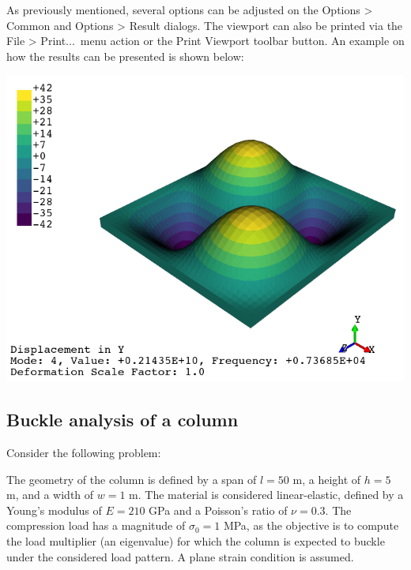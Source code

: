 \documentclass[
    11pt,        %
    a4paper,     %
    final,       %
    fleqn,       %
    notitlepage, %
    onecolumn,   %
    oneside,     %
]{article}
\begin{document}
As previously mentioned, several options can be adjusted on the Options > Common and Options > Result dialogs. The viewport can also be printed via the File > Print...\ menu action or the Print Viewport toolbar button. An example on how the results can be presented is shown below:
\begin{center}
    \includegraphics[scale=0.5]{fig/ui-3-11.png}
\end{center}

\subsection{Buckle analysis of a column}

Consider the following problem:
\begin{center}
\end{center}
The geometry of the column is defined by a span of $l = 50$ m, a height of $h = 5$ m, and a width of $w = 1$ m. The material is considered linear-elastic, defined by a Young's modulus of $E = 210$ GPa and a Poisson's ratio of $\nu = 0.3$. The compression load has a magnitude of $\sigma_0 = 1$ MPa, as the objective is to compute the load multiplier (an eigenvalue) for which the column is expected to buckle under the considered load pattern. A plane strain condition is assumed.
\end{document}
